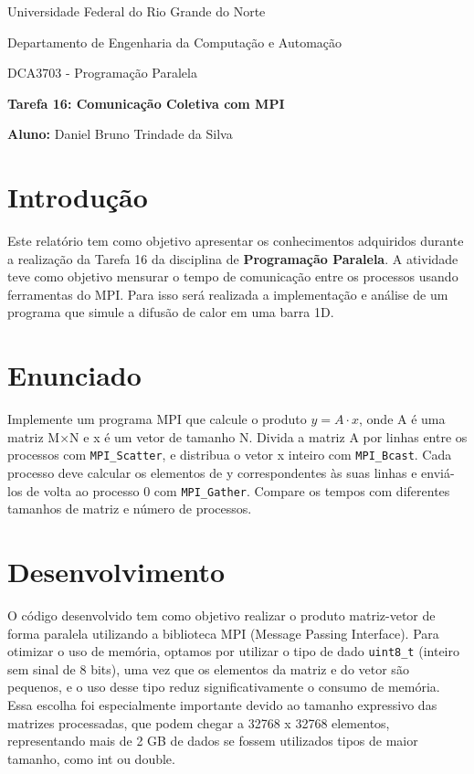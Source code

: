 \documentclass[a4paper, 12pt]{article}
\begin{document}
	
	\begin{center}
		Universidade Federal do Rio Grande do Norte
		
		Departamento de Engenharia da Computação e Automação  
		
		DCA3703 - Programação Paralela  
		
		\textbf{Tarefa 16: Comunicação Coletiva com MPI}  
		
		\textbf{Aluno:} Daniel Bruno Trindade da Silva  
	\end{center}  
	
	\section{Introdução}
	
	\hspace{0.62cm}Este relatório tem como objetivo apresentar os conhecimentos adquiridos durante a realização da Tarefa 16 da disciplina de \textbf{Programação Paralela}. A atividade teve como objetivo mensurar o tempo de comunicação entre os processos usando ferramentas do MPI. Para isso será realizada a implementação e análise de um programa que simule a difusão de calor em uma barra 1D. 
	
	\section{Enunciado}
	
	\hspace{0.62cm}Implemente um programa MPI que calcule o produto $y = A \cdot x$, onde A é uma matriz M×N e x é um vetor de tamanho N. Divida a matriz A por linhas entre os processos com \texttt{MPI\_Scatter}, e distribua o vetor x inteiro com \texttt{MPI\_Bcast}. Cada processo deve calcular os elementos de y correspondentes às suas linhas e enviá-los de volta ao processo 0 com \texttt{MPI\_Gather}. Compare os tempos com diferentes tamanhos de matriz e número de processos.
	
	\section{Desenvolvimento}
	\hspace{0.62cm}O código desenvolvido tem como objetivo realizar o produto matriz-vetor de forma paralela utilizando a biblioteca MPI (Message Passing Interface). Para otimizar o uso de memória, optamos por utilizar o tipo de dado \texttt{uint8\_t} (inteiro sem sinal de 8 bits), uma vez que os elementos da matriz e do vetor são pequenos, e o uso desse tipo reduz significativamente o consumo de memória. Essa escolha foi especialmente importante devido ao tamanho expressivo das matrizes processadas, que podem chegar a 32768 x 32768 elementos, representando mais de 2 GB de dados se fossem utilizados tipos de maior tamanho, como int ou double.
	
\end{document}
